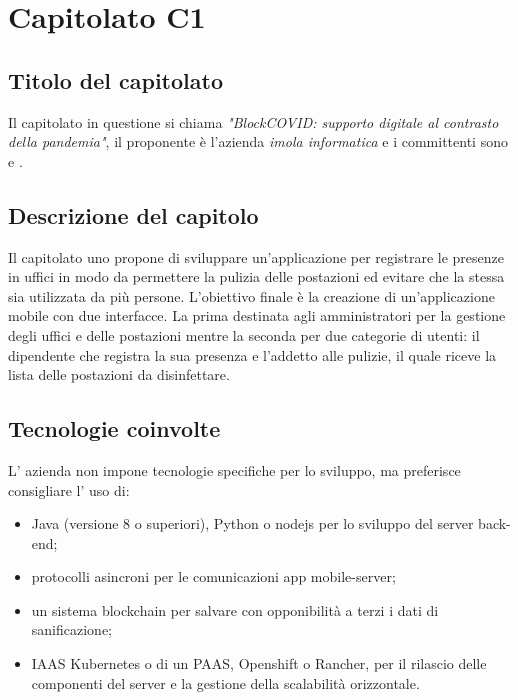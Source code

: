\section{Capitolato C1}
\subsection{Titolo del capitolato}
Il capitolato in questione si chiama \textit{"BlockCOVID: supporto digitale al contrasto della pandemia"}, il proponente \`e l'azienda \textit{imola informatica} e i committenti sono \VT{} e \CR{}.

\subsection{Descrizione del capitolo}
Il capitolato uno propone di sviluppare un'applicazione per registrare le presenze in uffici in modo da permettere la pulizia delle postazioni ed evitare che la stessa sia utilizzata da più persone.
L'obiettivo finale è la creazione di un'applicazione mobile con due interfacce. La prima destinata agli amministratori per la gestione degli uffici e delle postazioni mentre la seconda per due categorie di utenti: il dipendente che registra la sua presenza e l'addetto alle pulizie, il quale riceve la lista delle postazioni da disinfettare.

\subsection{Tecnologie coinvolte}
L' azienda non impone tecnologie specifiche per lo sviluppo, ma preferisce consigliare l' uso di:
\begin{itemize}
\item	Java (versione 8 o superiori), Python o nodejs per lo sviluppo del server back-end;
\item	protocolli asincroni per le comunicazioni app mobile-server;
\item	un sistema blockchain per salvare con opponibilità a terzi i dati di sanificazione;
\item	IAAS Kubernetes o di un PAAS, Openshift o Rancher, per il rilascio delle componenti del server e la gestione della scalabilità orizzontale.
\end{itemize}

